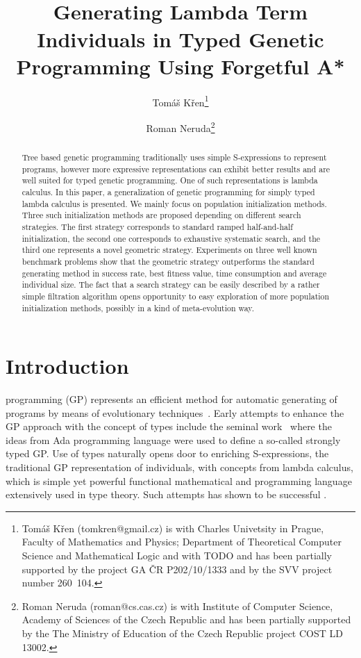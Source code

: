 \documentclass[conference]{IEEEtran}
\newcommand{\red}[1]{{\color{red} #1}}
\begin{document}
\title{\ \\ \LARGE\bf 
Generating Lambda Term Individuals in Typed Genetic Programming Using Forgetful A*}

\author{Tom\'{a}\v{s} K\v{r}en\thanks{Tomáš Křen (tomkren@gmail.cz) is with Charles Univetsity in Prague, Faculty of Mathematics and Physics; Department of Theoretical Computer Science and Mathematical Logic \red{and with TODO} and has been partially supported by the project GA ČR P202/10/1333 and by the SVV project number 260~104.} \and Roman Neruda\thanks{Roman Neruda (roman@cs.cas.cz) is with Institute of Computer Science, Academy of Sciences of the Czech Republic and has been partially supported by the The Ministry of Education of the Czech Republic project COST LD 13002.}}

\maketitle

\begin{abstract}
Tree based genetic programming traditionally uses simple S-expressions to represent programs, however more expressive representations can exhibit better results and are well suited for typed genetic programming. One of such representations is lambda calculus.
In this paper, a generalization of genetic programming 
for simply typed lambda calculus is presented. We mainly focus on
population initialization methods. 
Three such initialization methods are proposed 
depending on different search strategies. 
The first strategy corresponds to standard ramped half-and-half initialization, 
the second one corresponds to exhaustive systematic search, and the third one 
represents a novel geometric strategy.
Experiments on three well known benchmark problems show
that the geometric strategy outperforms
the standard generating method in success rate, best fitness value,
time consumption and average individual size.
The fact that a search strategy can be easily described by a rather simple filtration algorithm opens opportunity to easy exploration of more 
population initialization methods, possibly in a kind of meta-evolution way.
\end{abstract}

\section{Introduction}
 programming (GP) represents an efficient method for automatic generating of programs by means of evolutionary techniques~\cite{koza92,koza03}. Early attempts to enhance the GP approach with the concept of types include the seminal work~\cite{montana95} where the ideas from Ada programming language were used to define a so-called strongly typed GP.   
Use of types naturally opens door to enriching S-expressions,
the traditional GP representation of individuals, with concepts from
lambda calculus, which is simple yet powerful functional mathematical and programming 
language extensively used in type theory. Such attempts has shown to be 
successful \cite{yu01}. 
\end{document}
